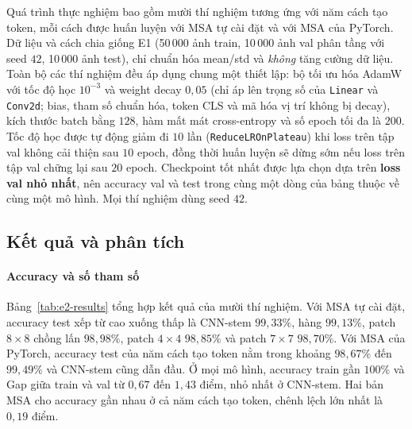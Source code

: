 \documentclass[a4paper,12pt]{article}
\begin{document}
Quá trình thực nghiệm bao gồm mười thí nghiệm tương ứng với năm cách tạo token, mỗi cách được huấn luyện với MSA tự cài đặt và với MSA của PyTorch. Dữ liệu và cách chia giống E1 (50\,000 ảnh train, 10\,000 ảnh val phân tầng với seed $42$, 10\,000 ảnh test), chỉ chuẩn hóa mean/std và \emph{không} tăng cường dữ liệu. Toàn bộ các thí nghiệm đều áp dụng chung một thiết lập: bộ tối ưu hóa AdamW với tốc độ học $10^{-3}$ và weight decay $0{,}05$ (chỉ áp lên trọng số của \texttt{Linear} và \texttt{Conv2d}; bias, tham số chuẩn hóa, token CLS và mã hóa vị trí không bị decay), kích thước batch bằng $128$, hàm mất mát cross-entropy và số epoch tối đa là $200$. Tốc độ học được tự động giảm đi $10$ lần (\texttt{ReduceLROnPlateau}) khi loss trên tập val không cải thiện sau $10$ epoch, đồng thời huấn luyện sẽ dừng sớm nếu loss trên tập val chững lại sau $20$ epoch. Checkpoint tốt nhất được lựa chọn dựa trên \textbf{loss val nhỏ nhất}, nên accuracy val và test trong cùng một dòng của bảng thuộc về cùng một mô hình. Mọi thí nghiệm dùng seed $42$.

\subsection{Kết quả và phân tích}
\label{sec:e2-results}

\paragraph{Accuracy và số tham số} Bảng~\ref{tab:e2-results} tổng hợp kết quả của mười thí nghiệm. Với MSA tự cài đặt, accuracy test xếp từ cao xuống thấp là CNN-stem $99{,}33\%$, hàng $99{,}13\%$, patch $8\times8$ chồng lấn $98{,}98\%$, patch $4\times4$ $98{,}85\%$ và patch $7\times7$ $98{,}70\%$. Với MSA của PyTorch, accuracy test của năm cách tạo token nằm trong khoảng $98{,}67\%$ đến $99{,}49\%$ và CNN-stem cũng dẫn đầu. Ở mọi mô hình, accuracy train gần $100\%$ và Gap giữa train và val từ $0{,}67$ đến $1{,}43$ điểm, nhỏ nhất ở CNN-stem. Hai bản MSA cho accuracy gần nhau ở cả năm cách tạo token, chênh lệch lớn nhất là $0{,}19$ điểm.
\end{document}
